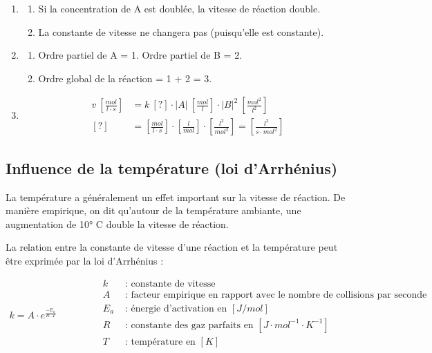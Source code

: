 \documentclass[
  11pt,
  a4paper,
  openany]{book}
\providecommand{\tightlist}{%
  \setlength{\itemsep}{0pt}\setlength{\parskip}{0pt}}
\begin{document}
\begin{Answer}

\begin{enumerate}
\def\labelenumi{\arabic{enumi}.}
\item
  \begin{enumerate}
  \def\labelenumii{\alph{enumii}.}
  \tightlist
  \item
    Si la concentration de A est doublée, la vitesse de réaction double.
  \item
    La constante de vitesse ne changera pas (puisqu'elle est constante).
  \end{enumerate}
\item
  \begin{enumerate}
  \def\labelenumii{\alph{enumii}.}
  \tightlist
  \item
    Ordre partiel de A = 1. Ordre partiel de B = 2.
  \item
    Ordre global de la réaction = 1 + 2 = 3.
  \end{enumerate}
\item
  \[
  \begin{split}
  v\ [\frac{mol}{l \cdot s}] &= k\ [?] \cdot |A|\ [\frac{mol}{l}] \cdot |B|^2 \ [\frac{mol^2}{l^2}] \\
  [?] &= [\frac{mol}{l \cdot s}] \cdot [\frac{l}{mol}] \cdot [\frac{l^2}{mol^2}] = [\frac{l^2}{s \cdot mol^2}]
  \end{split}
  \]
\end{enumerate}

\end{Answer}

\newpage

\hypertarget{influence-de-la-tempuxe9rature-loi-darrhuxe9nius}{%
\subsection{Influence de la température (loi d'Arrhénius)}\label{influence-de-la-tempuxe9rature-loi-darrhuxe9nius}}

La température a généralement un effet important sur la vitesse de réaction. De manière empirique, on dit qu'autour de la température ambiante, une augmentation de 10° C double la vitesse de réaction.

La relation entre la constante de vitesse d'une réaction et la température peut être exprimée par la loi d'Arrhénius :

\[
\begin{split}
k = A \cdot e^{\frac{-E_a}{R \cdot T}}
\end{split}
\qquad\qquad
\begin{split}
k &\text{ : constante de vitesse} \\
A &\text{ : facteur empirique en rapport avec le nombre de collisions par seconde } \\
E_a &\text{ : énergie d'activation en } [J/mol] \\
R &\text{ : constante des gaz parfaits en } [J \cdot mol^{-1} \cdot K^{-1}] \\
T &\text{ : température en } [K]
\end{split}
\]
\end{document}
